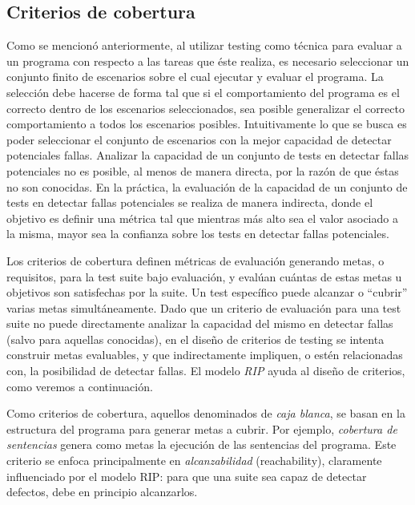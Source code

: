 \subsection{Criterios de cobertura}
\label{sec:preliminares.testing.covcriteria}


Como se mencion\'o anteriormente, al utilizar testing como t\'ecnica para evaluar a un programa con respecto a las tareas que \'este realiza, es necesario seleccionar un conjunto finito de escenarios sobre el cual ejecutar y evaluar el programa. La selecci\'on debe hacerse de forma tal que si el comportamiento del programa es el correcto dentro de los escenarios seleccionados, sea posible generalizar el correcto comportamiento a todos los escenarios posibles. Intuitivamente lo que se busca es poder seleccionar el conjunto de escenarios con la mejor capacidad de detectar potenciales fallas.
Analizar la capacidad de un conjunto de tests en detectar fallas potenciales no es posible, al menos de manera directa, por la raz\'on de que \'estas no son conocidas. En la pr\'actica, la evaluaci\'on de la capacidad de un conjunto de tests en detectar fallas potenciales se realiza de manera indirecta, donde el objetivo es definir una m\'etrica tal que mientras m\'as alto sea el valor asociado a la misma, mayor sea la confianza sobre los tests en detectar fallas potenciales.

Los criterios de cobertura definen m\'etricas de evaluaci\'on generando metas, o requisitos, para la test suite bajo evaluaci\'on, y eval\'uan cu\'antas de estas metas u objetivos son satisfechas por la suite. Un test espec\'ifico puede alcanzar o ``cubrir'' varias metas simult\'aneamente. Dado que un criterio de evaluaci\'on para una test suite no puede directamente analizar la capacidad del mismo en detectar fallas (salvo para aquellas conocidas), en el dise\~no de criterios de testing se intenta construir metas evaluables, y que indirectamente impliquen, o est\'en relacionadas con, la posibilidad de detectar fallas. El modelo \emph{RIP} ayuda al dise\~no de criterios, como veremos a continuaci\'on.

Como criterios de cobertura, aquellos denominados de \emph{caja blanca}, se basan en la estructura del programa para generar metas a cubrir. Por ejemplo, \emph{cobertura de sentencias} genera como metas la ejecuci\'on de las sentencias del programa. Este criterio se enfoca principalmente en \emph{alcanzabilidad} (reachability), claramente influenciado por el modelo RIP: para que una suite sea capaz de detectar defectos, debe en principio alcanzarlos. 

